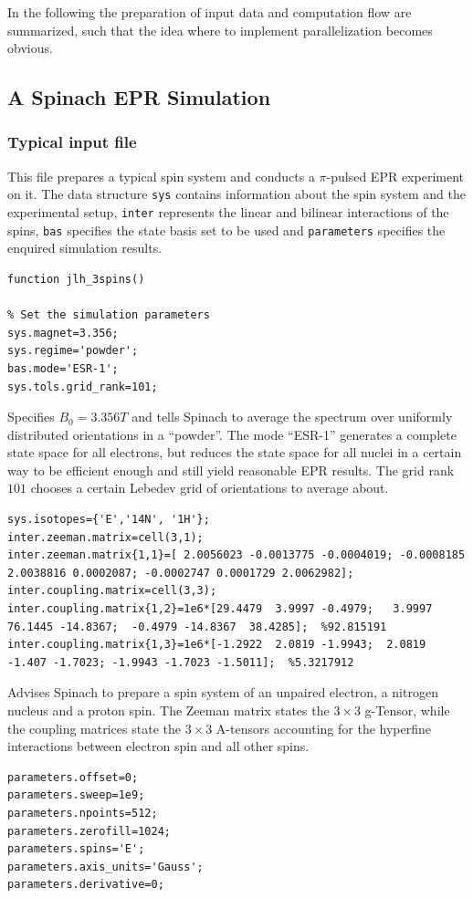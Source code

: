 \documentclass[11.5pt,a4paper]{article}
\begin{document}
In the following the preparation of input data and computation flow are summarized, such that the idea where to implement parallelization becomes obvious.

\subsection{A Spinach EPR Simulation}
\subsubsection{Typical input file}
This file prepares a typical spin system and conducts a $\pi$-pulsed EPR experiment on it. The data structure \verb$sys$ contains information about the spin system and the experimental setup, \verb$inter$ represents the linear and bilinear interactions of the spins, \verb$bas$ specifies the state basis set to be used and \verb$parameters$ specifies the enquired simulation results. 
\begin{lstlisting}
function jlh_3spins()

% Set the simulation parameters
sys.magnet=3.356;
sys.regime='powder';
bas.mode='ESR-1';
sys.tols.grid_rank=101;
\end{lstlisting} 
Specifies $B_0 = 3.356 T$ and tells Spinach to average the spectrum over uniformly distributed orientations in a ``powder''. The mode ``ESR-1'' generates a complete state space for all electrons, but reduces the state space for all nuclei in a certain way to be efficient enough and still yield reasonable EPR results. The grid rank $101$ chooses a certain Lebedev grid of orientations to average about.
\begin{lstlisting}[firstnumber=last]
% Interactions
sys.isotopes={'E','14N', '1H'};
inter.zeeman.matrix=cell(3,1);
inter.zeeman.matrix{1,1}=[ 2.0056023 -0.0013775 -0.0004019; -0.0008185 2.0038816 0.0002087; -0.0002747 0.0001729 2.0062982];
inter.coupling.matrix=cell(3,3);
inter.coupling.matrix{1,2}=1e6*[29.4479  3.9997 -0.4979;   3.9997  76.1445 -14.8367;  -0.4979 -14.8367  38.4285];  %92.815191
inter.coupling.matrix{1,3}=1e6*[-1.2922  2.0819 -1.9943;  2.0819  -1.407 -1.7023; -1.9943 -1.7023 -1.5011];  %5.3217912
\end{lstlisting}
Advises Spinach to prepare a spin system of an unpaired electron, a nitrogen nucleus and a proton spin. The Zeeman matrix states the $3\times 3$ g-Tensor, while the coupling matrices state the $3\times 3$ A-tensors accounting for the hyperfine interactions between electron spin and all other spins.
\begin{lstlisting}[firstnumber=last]
% Set the sequence parameters
parameters.offset=0;
parameters.sweep=1e9;
parameters.npoints=512;
parameters.zerofill=1024;
parameters.spins='E';
parameters.axis_units='Gauss';
parameters.derivative=0;
\end{lstlisting}
\end{document}
